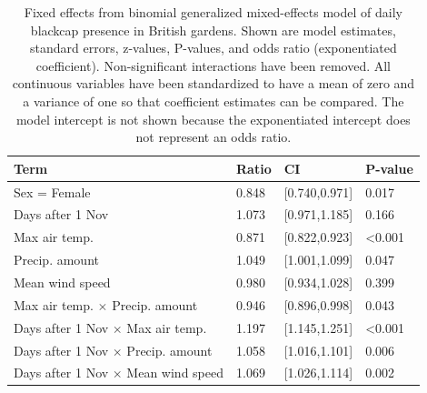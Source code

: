 \documentclass[a4paper, twoside]{templates/ociamthesis}
\begin{document}
\begin{table}[t]

\caption{\label{tab:indiv-model-table}Fixed effects from binomial generalized mixed-effects model of daily blackcap presence in British gardens. Shown are model estimates, standard errors, z-values, P-values, and odds ratio (exponentiated coefficient). Non-significant interactions have been removed. All continuous variables have been standardized to have a mean of zero and a variance of one so that coefficient estimates can be compared. The model intercept is not shown because the exponentiated intercept does not represent an odds ratio.}
\centering
\begin{tabular}{l|l|l|l}
\hline
Term & Ratio & CI & P-value\\
\hline
Sex = Female & 0.848 & [0.740,0.971] & 0.017\\
\hline
Days after 1 Nov & 1.073 & [0.971,1.185] & 0.166\\
\hline
Max air temp. & 0.871 & [0.822,0.923] & <0.001\\
\hline
Precip. amount & 1.049 & [1.001,1.099] & 0.047\\
\hline
Mean wind speed & 0.980 & [0.934,1.028] & 0.399\\
\hline
Max air temp. $\times$ Precip. amount & 0.946 & [0.896,0.998] & 0.043\\
\hline
Days after 1 Nov $\times$ Max air temp. & 1.197 & [1.145,1.251] & <0.001\\
\hline
Days after 1 Nov $\times$ Precip. amount & 1.058 & [1.016,1.101] & 0.006\\
\hline
Days after 1 Nov $\times$ Mean wind speed & 1.069 & [1.026,1.114] & 0.002\\
\hline
\end{tabular}
\end{table}
\end{document}
